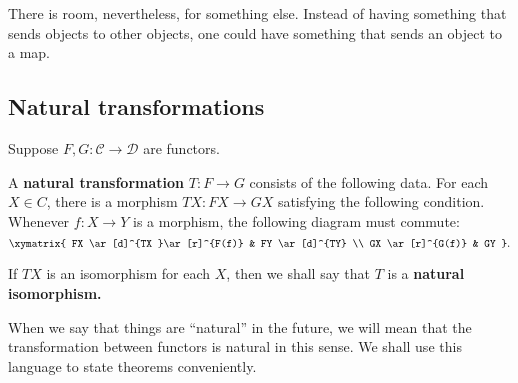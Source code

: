 There is room, nevertheless, for something else. Instead of having
something that sends objects to other objects, one could have something that
sends an object to a map.



\subsection{Natural transformations}



Suppose $F, G: \mathcal{C} \to \mathcal{D}$ are functors.

\begin{definition}
A \textbf{natural transformation} $T: F \to G$ consists of the following data.
For each $X \in C$, there is a morphism $TX: FX \to GX$ satisfying the
following
condition. Whenever $f: X \to Y$ is a morphism, the following diagram must
commute:
\[ \xymatrix{
FX \ar[d]^{TX }\ar[r]^{F(f)} &  FY \ar[d]^{TY}  \\
GX \ar[r]^{G(f)} &  GY
}.\]

If $TX$ is an isomorphism for each $X$, then we shall say that $T$ is a
\textbf{natural isomorphism.}
\end{definition}

When we say that things are ``natural'' in the future, we will mean that the
transformation between functors is natural in this sense.
We shall use this language to state theorems conveniently.

